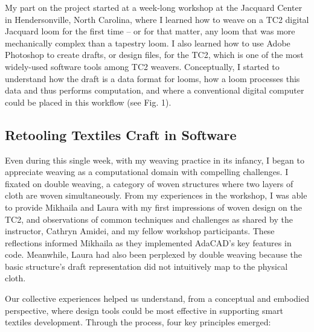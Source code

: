 My part on the project started at a week-long workshop at the Jacquard Center in Hendersonville, North Carolina, where I learned how to weave on a TC2 digital Jacquard loom for the first time -- or for that matter, any loom that was more mechanically complex than a tapestry loom. I also learned how to use Adobe Photoshop to create drafts, or design files, for the TC2, which is one of the most widely-used software tools among TC2 weavers. Conceptually, I started to understand how the draft is a data format for looms, how a loom processes this data and thus performs computation, and where a conventional digital computer could be placed in this workflow (see Fig. 1).

\subsection{Retooling Textiles Craft in Software}

Even during this single week, with my weaving practice in its infancy, I began to appreciate weaving as a computational domain with compelling challenges. I fixated on double weaving, a category of woven structures where two layers of cloth are woven simultaneously. From my experiences in the workshop, I was able to provide Mikhaila and Laura with my first impressions of woven design on the TC2, and observations of common techniques and challenges as shared by the instructor, Cathryn Amidei, and my fellow workshop participants. These reflections informed Mikhaila as they implemented AdaCAD's key features in code. Meanwhile, Laura had also been perplexed by double weaving because the basic structure's draft representation did not intuitively map to the physical cloth.

Our collective experiences helped us understand, from a conceptual and embodied perspective, where design tools could be most effective in supporting smart textiles development. Through the process, four key principles emerged:

